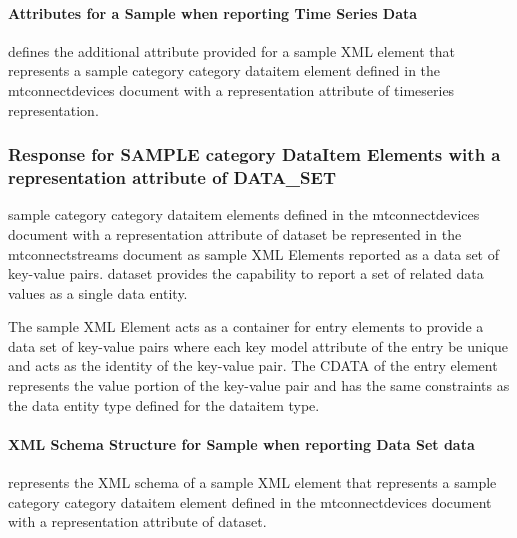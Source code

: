 \paragraph{Attributes for a Sample when reporting Time Series Data}\mbox{}

 defines the additional attribute provided for a \gls{sample} XML element that represents a \gls{sample category} category \gls{dataitem} element defined in the \gls{mtconnectdevices} document with a representation attribute of \gls{timeseries representation}. 



\subsubsection{Response for SAMPLE category DataItem Elements with a representation attribute of DATA_SET}
\label{sec:Response for SAMPLE category DataItem Elements with a representation attribute of DATA_SET}

\gls{sample category} category \gls{dataitem} elements defined in the \gls{mtconnectdevices} document with a \gls{representation} attribute of \gls{dataset} \MUST be represented in the \gls{mtconnectstreams} document as \gls{sample} XML Elements reported as a  \gls{data set} of \glspl{key-value pair}. \gls{dataset} provides the capability to report a set of related data values as a single \gls{data entity}.

The \gls{sample} XML Element acts as a container for \gls{entry} elements to provide a \gls{data set} of \glspl{key-value pair} where each \gls{key model} attribute of the \gls{entry} \MUST be unique and acts as the identity of the \gls{key-value pair}. The CDATA of the \gls{entry} element represents the value portion of the \gls{key-value pair} and has the same constraints as the \gls{data entity} type defined for the \gls{dataitem} \gls{type}.

\paragraph{XML Schema Structure for Sample when reporting Data Set data}\mbox{}
\label{sec:XML Schema Structure for Sample when reporting Data Set data}

 represents the XML schema of a \gls{sample} XML element that represents a \gls{sample category} category \gls{dataitem} element defined in the \gls{mtconnectdevices} document with a \gls{representation} attribute of \gls{dataset}.

